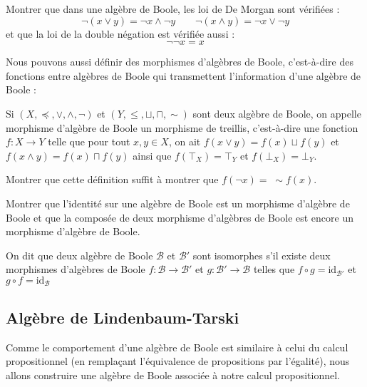 \begin{exo}
    Montrer que dans une algèbre de Boole, les loi de De Morgan sont vérifiées : $$\lnot(x\vee y) = \lnot x \wedge \lnot y\qquad \lnot(x\wedge y) = \lnot x \vee \lnot y$$
    et que la loi de la double négation est vérifiée aussi : $$ \lnot\lnot x = x$$
\end{exo}

Nous pouvons aussi définir des morphismes d'algèbres de Boole, c'est-à-dire des fonctions entre algèbres de Boole qui transmettent l'information d'une algèbre de Boole :

\begin{defi}
    Si $(X,\preceq,\lor,\land,\lnot)$ et $(Y,\leq,\sqcup,\sqcap,\sim)$ sont deux algèbre de Boole, on appelle morphisme d'algèbre de Boole un morphisme de treillis, c'est-à-dire une fonction $f : X \to Y$ telle que pour tout $x,y\in X$, on ait $f(x\vee y)=f(x)\sqcup f(y)$ et $f(x\wedge y)=f(x)\sqcap f(y)$ ainsi que $f(\top_X)=\top_Y$ et $f(\bot_X)=\bot_Y$.
\end{defi}

\begin{exo}
    Montrer que cette définition suffit à montrer que $f(\lnot x)= \;\sim\!\! f(x)$.
\end{exo}

\begin{exo}
    Montrer que l'identité sur une algèbre de Boole est un morphisme d'algèbre de Boole et que la composée de deux morphisme d'algèbres de Boole est encore un morphisme d'algèbre de Boole.
\end{exo}

\begin{defi}
    On dit que deux algèbre de Boole $\mathcal B$ et $\mathcal B'$ sont isomorphes s'il existe deux morphismes d'algèbres de Boole $f : \mathcal B \to \mathcal B'$ et $g : \mathcal B' \to \mathcal B$ telles que $f\circ g = \mathrm{id}_{\mathcal B'}$ et $g\circ f = \mathrm{id}_{\mathcal B}$
\end{defi}

\subsection{Algèbre de Lindenbaum-Tarski}

Comme le comportement d'une algèbre de Boole est similaire à celui du calcul propositionnel (en remplaçant l'équivalence de propositions par l'égalité), nous allons construire une algèbre de Boole associée à notre calcul propositionnel.

